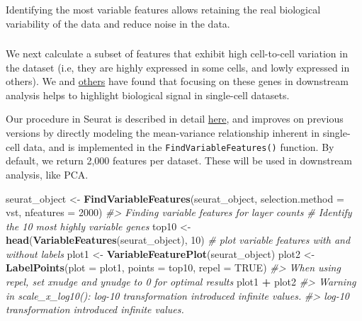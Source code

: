 \documentclass[
]{book}
\newenvironment{Shaded}{\begin{snugshade}}{\end{snugshade}}
\newcommand{\AttributeTok}[1]{\textcolor[rgb]{0.13,0.29,0.53}{#1}}
\newcommand{\CommentTok}[1]{\textcolor[rgb]{0.56,0.35,0.01}{\textit{#1}}}
\newcommand{\ConstantTok}[1]{\textcolor[rgb]{0.56,0.35,0.01}{#1}}
\newcommand{\DecValTok}[1]{\textcolor[rgb]{0.00,0.00,0.81}{#1}}
\newcommand{\FunctionTok}[1]{\textcolor[rgb]{0.13,0.29,0.53}{\textbf{#1}}}
\newcommand{\NormalTok}[1]{#1}
\newcommand{\OtherTok}[1]{\textcolor[rgb]{0.56,0.35,0.01}{#1}}
\newcommand{\SpecialCharTok}[1]{\textcolor[rgb]{0.81,0.36,0.00}{\textbf{#1}}}
\newcommand{\StringTok}[1]{\textcolor[rgb]{0.31,0.60,0.02}{#1}}
\begin{document}
Identifying the most variable features allows retaining the real biological variability of the data and reduce noise in the data.

\hypertarget{section-4}{%
\subsubsection*{}\label{section-4}}

We next calculate a subset of features that exhibit high cell-to-cell variation in the dataset (i.e, they are highly expressed in some cells, and lowly expressed in others). We and \href{https://www.nature.com/articles/nmeth.2645}{others} have found that focusing on these genes in downstream analysis helps to highlight biological signal in single-cell datasets.

Our procedure in Seurat is described in detail \href{https://doi.org/10.1016/j.cell.2019.05.031}{here}, and improves on previous versions by directly modeling the mean-variance relationship inherent in single-cell data, and is implemented in the \texttt{FindVariableFeatures()} function. By default, we return 2,000 features per dataset. These will be used in downstream analysis, like PCA.

\begin{Shaded}
\begin{Highlighting}[]
\NormalTok{seurat\_object }\OtherTok{\textless{}{-}} \FunctionTok{FindVariableFeatures}\NormalTok{(seurat\_object, }\AttributeTok{selection.method =} \StringTok{\textquotesingle{}vst\textquotesingle{}}\NormalTok{, }\AttributeTok{nfeatures =} \DecValTok{2000}\NormalTok{)}
\CommentTok{\#\textgreater{} Finding variable features for layer counts}
\CommentTok{\# Identify the 10 most highly variable genes}
\NormalTok{top10 }\OtherTok{\textless{}{-}} \FunctionTok{head}\NormalTok{(}\FunctionTok{VariableFeatures}\NormalTok{(seurat\_object), }\DecValTok{10}\NormalTok{)}
\CommentTok{\# plot variable features with and without labels}
\NormalTok{plot1 }\OtherTok{\textless{}{-}} \FunctionTok{VariableFeaturePlot}\NormalTok{(seurat\_object)}
\NormalTok{plot2 }\OtherTok{\textless{}{-}} \FunctionTok{LabelPoints}\NormalTok{(}\AttributeTok{plot =}\NormalTok{ plot1, }\AttributeTok{points =}\NormalTok{ top10, }\AttributeTok{repel =} \ConstantTok{TRUE}\NormalTok{)}
\CommentTok{\#\textgreater{} When using repel, set xnudge and ynudge to 0 for optimal results}
\NormalTok{plot1 }\SpecialCharTok{+}\NormalTok{ plot2}
\CommentTok{\#\textgreater{} Warning in scale\_x\_log10(): log{-}10 transformation introduced infinite values.}
\CommentTok{\#\textgreater{} log{-}10 transformation introduced infinite values.}
\end{Highlighting}
\end{Shaded}
\end{document}

